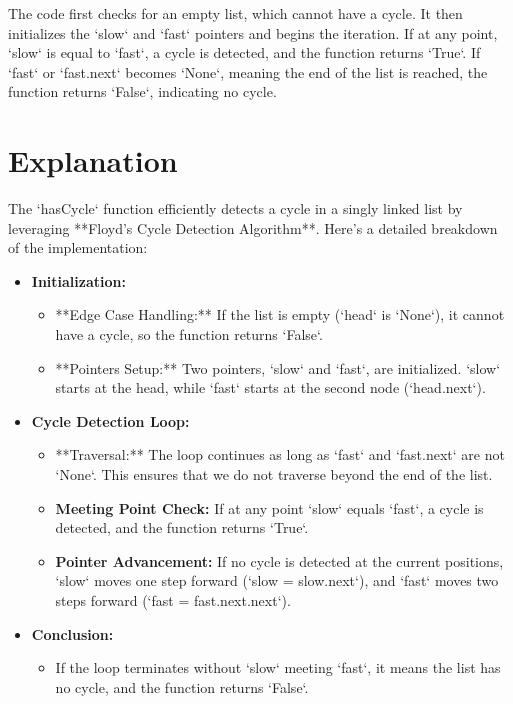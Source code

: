 The code first checks for an empty list, which cannot have a cycle. It then initializes the `slow` and `fast` pointers and begins the iteration. If at any point, `slow` is equal to `fast`, a cycle is detected, and the function returns `True`. If `fast` or `fast.next` becomes `None`, meaning the end of the list is reached, the function returns `False`, indicating no cycle.

\section*{Explanation}
The `hasCycle` function efficiently detects a cycle in a singly linked list by leveraging **Floyd's Cycle Detection Algorithm**. Here's a detailed breakdown of the implementation:

\begin{itemize}
    \item \textbf{Initialization:}
    \begin{itemize}
        \item **Edge Case Handling:** If the list is empty (`head` is `None`), it cannot have a cycle, so the function returns `False`.
        \item **Pointers Setup:** Two pointers, `slow` and `fast`, are initialized. `slow` starts at the head, while `fast` starts at the second node (`head.next`).
    \end{itemize}
    
    \item \textbf{Cycle Detection Loop:}
    \begin{itemize}
        \item **Traversal:** The loop continues as long as `fast` and `fast.next` are not `None`. This ensures that we do not traverse beyond the end of the list.
        \item \textbf{Meeting Point Check:} If at any point `slow` equals `fast`, a cycle is detected, and the function returns `True`.
        \item \textbf{Pointer Advancement:} If no cycle is detected at the current positions, `slow` moves one step forward (`slow = slow.next`), and `fast` moves two steps forward (`fast = fast.next.next`).
    \end{itemize}
    
    \item \textbf{Conclusion:}
    \begin{itemize}
        \item If the loop terminates without `slow` meeting `fast`, it means the list has no cycle, and the function returns `False`.
    \end{itemize}
\end{itemize}

